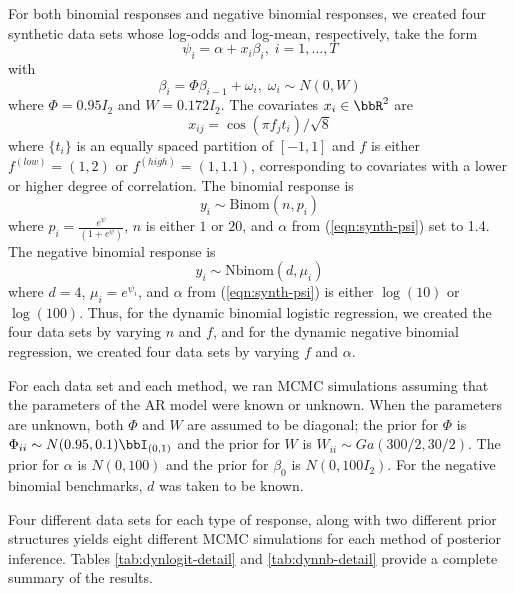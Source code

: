 \documentclass[11pt]{article}
\begin{document}
For both binomial responses and negative binomial responses, we created four
synthetic data sets whose log-odds and log-mean, respectively, take the form
\begin{equation}
\label{eqn:synth-psi}
\psi_i = \alpha + x_i \beta_i, \; i = 1, \ldots, T
\end{equation}
with
\[
\beta_i = \Phi \beta_{i-1} + \omega_i, \; \omega_i \sim N(0, W)
\]
where $\Phi = 0.95 I_2$ and $W = 0.172 I_2$.  The covariates $x_i \in \bbR^2$
are 
\[
x_{ij} = \cos(\pi f_j t_i) / \sqrt{8}
\]
where $\{t_i\}$ is an equally spaced partition of $[-1,1]$ and $f$ is either
$f^{(low)} = (1,2)$ or $f^{(high)} = (1,1.1)$, corresponding to covariates with
a lower or higher degree of correlation.  The binomial response is
\[
y_i \sim \text{Binom}(n, p_i)
\]
where $p_i = \frac{e^{\psi}}{(1+e^{\psi})}$, $n$ is either $1$ or $20$, and
$\alpha$ from (\ref{eqn:synth-psi}) set to 1.4.  The negative binomial response
is
\[
y_i \sim \text{Nbinom}(d, \mu_i)
\]
where $d=4$, $\mu_i = e^{\psi_i}$, and $\alpha$ from (\ref{eqn:synth-psi}) is
either $\log(10)$ or $\log(100)$.  Thus, for the dynamic binomial logistic
regression, we created the four data sets by varying $n$ and $f$, and for the
dynamic negative binomial regression, we created four data sets by varying $f$
and $\alpha$.

For each data set and each method, we ran MCMC simulations assuming that the
parameters of the AR model were known or unknown.  When the parameters are
unknown, both $\Phi$ and $W$ are assumed to be diagonal; the prior for $\Phi$ is
$\Phi_{ii} \sim N(0.95, 0.1) \bbI_{(0,1)}$ and the prior for $W$ is $W_{ii} \sim
Ga(300/2, 30/2)$.  The prior for $\alpha$ is $N(0, 100)$ and the prior for
$\beta_0$ is $N(0, 100 I_2)$.  For the negative binomial benchmarks, $d$ was
taken to be known.

Four different data sets for each type of response, along with two different
prior structures yields eight different MCMC simulations for each method of
posterior inference.  Tables \ref{tab:dynlogit-detail} and
\ref{tab:dynnb-detail} provide a complete summary of the results.

\end{document}
